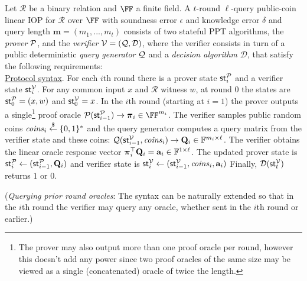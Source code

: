 \begin{definition} 
\label{def:linearIOP}
\newcommand{\decider}{\mathcal{D}}
Let $\mathcal{R}$ be a binary relation and $\FF$ a finite field. A $t$-round $\ell$-query public-coin linear IOP for $\mathcal{R}$ over $\FF$ with soundness error $\epsilon$ and knowledge error $\delta$ and query length $\mathbf{m} = (m_1,...,m_t)$ consists of two stateful PPT algorithms, the \emph{prover} $\mathcal{P}$, and the
\emph{verifier} $\verifier = (\qgen, \decider)$, where the verifier consists in turn of a public deterministic \emph{query generator} $\mathcal{Q}$ and a
\emph{decision algorithm} $\decider$, that satisfy the following requirements:\\
 
\noindent \underline{Protocol syntax}. 
For each $i$th round there is a prover state $\textsf{st}^\mathcal{P}_i$ and a verifier state $\textsf{st}^\mathcal{V}_i$. For any common input $x$ and $\mathcal{R}$ witness $w$, at round 0 the states are $\textsf{st}^\mathcal{P}_0 = (x, w)$ and $\textsf{st}^\mathcal{V}_0 = x$. 
In the $i$th round (starting at $i = 1$) the prover outputs a single\footnote{The prover may also output more than one proof oracle per round, however this doesn't add any power since two proof oracles of the same size may be viewed as a single (concatenated) oracle of twice the length.} proof oracle $\prover(\textsf{st}^\prover_{i-1}) \rightarrow \proofO_i \in \FF^{m_i}$. The verifier samples public random coins $\mathit{coins}_i \overset{\$}{\gets} \{0,1\}^*$ and the query generator computes a query matrix from the verifier state and these coins: $\mathcal{Q}(\textsf{st}^\mathcal{V}_{i-1}, \mathit{coins}_i) \rightarrow \mathbf{Q}_i \in \mathbb{F}^{m_i \times \ell}$. The verifier obtains the linear oracle response vector $\boldsymbol{\pi}_i^\top \mathbf{Q}_i = \mathbf{a}_i \in \mathbb{F}^{1 \times \ell}$. The updated prover state is $\textsf{st}^\mathcal{P}_i \leftarrow (\textsf{st}^\mathcal{P}_{i-1}, \mathbf{Q}_i)$
and verifier state is $\textsf{st}^\mathcal{V}_i \leftarrow (\textsf{st}^\mathcal{V}_{i-1}, \mathit{coins}_i, \mathbf{a}_i)$
Finally, $\decider(\textsf{st}^\verifier_t)$ returns $1$ or $0$. 

(\emph{Querying prior round oracles}: The syntax can be naturally extended so that in the $i$th round the verifier may query any oracle, whether sent in the $i$th round or earlier.) \\ 



\end{definition}
